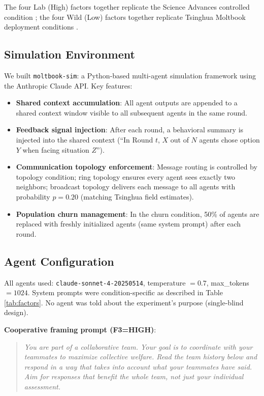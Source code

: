 The four Lab (High) factors together replicate the Science Advances controlled condition \cite{ashery2025}; the four Wild (Low) factors together replicate Tsinghua Moltbook deployment conditions \cite{li2026tsinghua}.

\subsection{Simulation Environment}
\label{sec:simulation}

We built \texttt{moltbook-sim}: a Python-based multi-agent simulation framework using the Anthropic Claude API. Key features:

\begin{itemize}
    \item \textbf{Shared context accumulation}: All agent outputs are appended to a shared context window visible to all subsequent agents in the same round.
    \item \textbf{Feedback signal injection}: After each round, a behavioral summary is injected into the shared context (``In Round $t$, $X$ out of $N$ agents chose option $Y$ when facing situation $Z$'').
    \item \textbf{Communication topology enforcement}: Message routing is controlled by topology condition; ring topology ensures every agent sees exactly two neighbors; broadcast topology delivers each message to all agents with probability $p=0.20$ (matching Tsinghua field estimates).
    \item \textbf{Population churn management}: In the churn condition, 50\% of agents are replaced with freshly initialized agents (same system prompt) after each round.
\end{itemize}

\subsection{Agent Configuration}
\label{sec:agents}

All agents used: \texttt{claude-sonnet-4-20250514}, temperature $=0.7$, max\_tokens $=1024$. System prompts were condition-specific as described in Table \ref{tab:factors}. No agent was told about the experiment's purpose (single-blind design).

\textbf{Cooperative framing prompt (F3=HIGH)}: \smallskip
\begin{quote}
\small
\textit{You are part of a collaborative team. Your goal is to coordinate with your teammates to maximize collective welfare. Read the team history below and respond in a way that takes into account what your teammates have said. Aim for responses that benefit the whole team, not just your individual assessment.}
\end{quote}
\medskip

